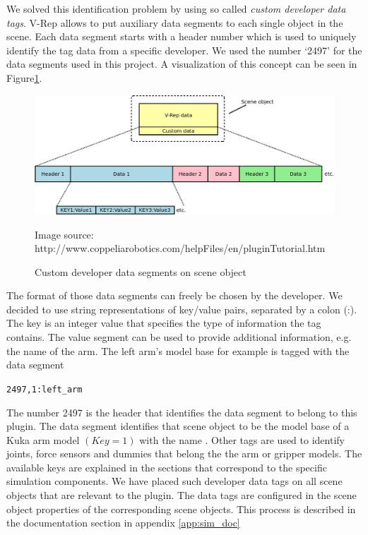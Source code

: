 We solved this identification problem by using so called \emph{custom developer data tags}. V-Rep allows to put auxiliary data segments to each single object in the scene. Each data segment starts with a header number which is used to uniquely identify the tag data from a specific developer. We used the number `2497' for the data segments used in this project. A visualization of this concept can be seen in Figure\ref{fig:cust_dev_data}. 
\begin{figure}[h]
	\centering
  	\includegraphics[width=1.0\textwidth]{images/custom_dev_data.jpg}
	\caption{Custom developer data segments on scene object}
	{\scriptsize Image source: http://www.coppeliarobotics.com/helpFiles/en/pluginTutorial.htm}
	\label{fig:cust_dev_data}
\end{figure}
The format of those data segments can freely be chosen by the developer. We decided to use string representations of key/value pairs, separated by a colon (:). The key is an integer value that specifies the type of information the tag contains. The value segment can be used to provide additional information, e.g. the name of the arm. The left arm's model base for example is tagged with the data segment 
\begin{center}
\texttt{2497,1:left\_arm}
\end{center}
The number 2497 is the header that identifies the data segment to belong to this plugin. The data segment identifies that scene object to be the model base of a Kuka arm model $(Key=1)$ with the name . Other tags are used to identify joints, force sensors and dummies that belong the the arm or gripper models. The available keys are explained in the sections that correspond to the specific simulation components. We have placed such developer data tags on all scene objects that are relevant to the plugin. The data tags are configured in the scene object properties of the corresponding scene objects. This process is described in the documentation section in appendix \ref{app:sim_doc} \\


